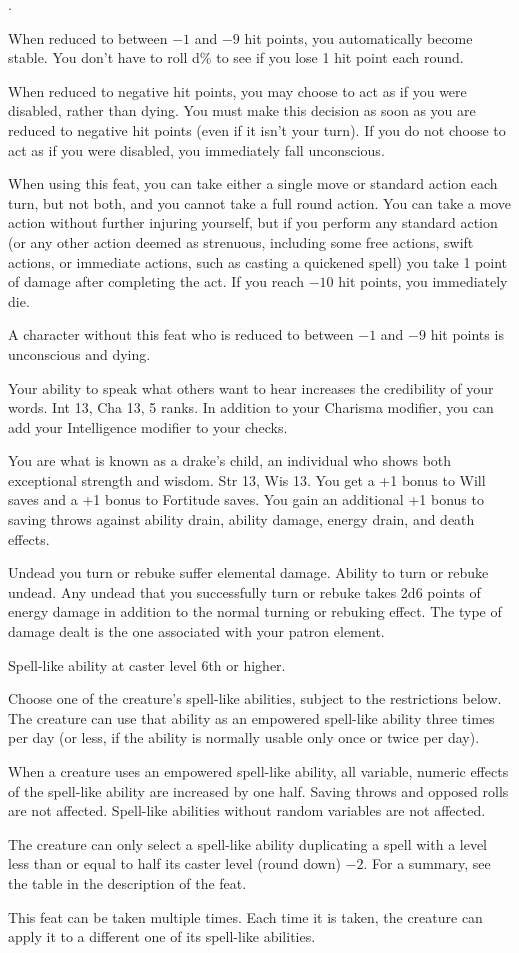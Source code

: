 {}
{.}
{When reduced to between $-1$ and $-9$ hit points, you automatically become stable. You don't have to roll d\% to see if you lose 1 hit point each round.

When reduced to negative hit points, you may choose to act as if you were disabled, rather than dying. You must make this decision as soon as you are reduced to negative hit points (even if it isn't your turn). If you do not choose to act as if you were disabled, you immediately fall unconscious.

When using this feat, you can take either a single move or standard action each turn, but not both, and you cannot take a full round action. You can take a move action without further injuring yourself, but if you perform any standard action (or any other action deemed as strenuous, including some free actions, swift actions, or immediate actions, such as casting a quickened spell) you take 1 point of damage after completing the act. If you reach $-10$ hit points, you immediately die.}
{A character without this feat who is reduced to between $-1$ and $-9$ hit points is unconscious and dying.}
{}

{Your ability to speak what others want to hear increases the credibility of your words.}
{Int 13, Cha 13,  5 ranks.}
{In addition to your Charisma modifier, you can add your Intelligence modifier to your  checks.}
{}{}

{You are what is known as a drake's child, an individual who shows both exceptional strength and wisdom.}
{Str 13, Wis 13.}
{You get a +1 bonus to Will saves and a +1 bonus to Fortitude saves. You gain an additional +1 bonus to saving throws against ability drain, ability damage, energy drain, and death effects.}
{}{}

{Undead you turn or rebuke suffer elemental damage.}
{Ability to turn or rebuke undead.}
{Any undead that you successfully turn or rebuke takes 2d6 points of energy damage in addition to the normal turning or rebuking effect. The type of damage dealt is the one associated with your patron element.}
{}{}

{}
{Spell-like ability at caster level 6th or higher.}
{Choose one of the creature's spell-like abilities, subject to the restrictions below. The creature can use that ability as an empowered spell-like ability three times per day (or less, if the ability is normally usable only once or twice per day).

When a creature uses an empowered spell-like ability, all variable, numeric effects of the spell-like ability are increased by one half. Saving throws and opposed rolls are not affected. Spell-like abilities without random variables are not affected.

The creature can only select a spell-like ability duplicating a spell with a level less than or equal to half its caster level (round down) $-2$. For a summary, see the table in the description of the  feat.}
{}
{This feat can be taken multiple times. Each time it is taken, the creature can apply it to a different one of its spell-like abilities.}

